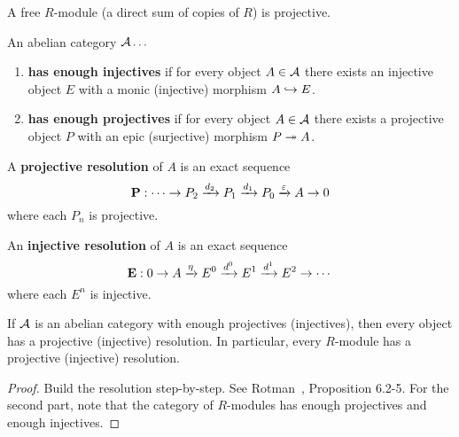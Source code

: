 \begin{ex}
A free $R$-module (a direct sum of copies of $R$) is projective.
\end{ex}
\begin{df}
An abelian category $\cal A\ldots$
\begin{enumerate}
\item
\textbf{has enough injectives} if for every object $A\in \cal A$ there exists an injective object $E$ with a monic (injective) morphism $A\hra E$.
\item
\textbf{has enough projectives} if for every object $A\in \cal A$ there exists a projective object $P$ with an epic (surjective) morphism $P\tra A$.
\end{enumerate}
\end{df}
\begin{df}
A \textbf{projective resolution} of $A$ is an exact sequence
\[
\mathbf{P}: \cdots \to P_2\xra{d_2}P_1\xra{d_1}P_0 \xra{\ep}A\to 0
\]
where each $P_n$ is projective.

An \textbf{injective resolution} of $A$ is an exact sequence
\[
\mathbf{E}: 0\to A\xra{\eta} E^0\xra{d^0} E^1 \xra{d^1} E^2\to\cdots
\]
where each $E^n$ is injective.
\end{df}
\begin{pr}
If $\cal A$ is an abelian category with enough projectives (injectives), then every object has a projective (injective) resolution. In particular, every $R$-module has a projective (injective) resolution.
\end{pr}
\begin{proof}
Build the resolution step-by-step. See Rotman~\cite{Ro09}, Proposition 6.2-5. For the second part, note that the category of $R$-modules has enough projectives and enough injectives.
\end{proof}
